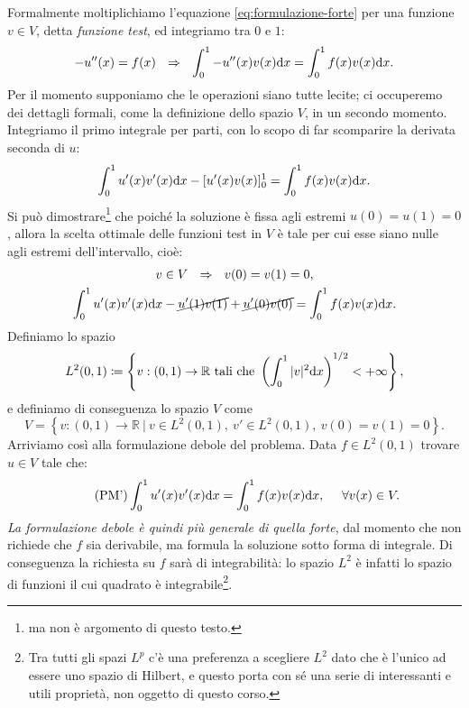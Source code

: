 Formalmente moltiplichiamo l'equazione \eqref{eq:formulazione-forte} per una funzione $v\in V$, detta \textit{funzione test}, ed integriamo tra $0$ e $1$:
\begin{equation*}
	-u''(x) =f(x)\ \ \Rightarrow\ \ \int\nolimits ^{1}_{0} -u''(x) v(x) \dx=\int\nolimits ^{1}_{0} f(x) v(x) \dx.
\end{equation*}
Per il momento supponiamo che le operazioni siano tutte lecite; ci occuperemo dei dettagli formali, come la definizione dello spazio $V$, in un secondo momento.
Integriamo il primo integrale per parti, con lo scopo di far scomparire la derivata seconda di $u$:
\begin{equation*}
	\int\nolimits ^{1}_{0} u'(x) v'(x) \mathrm d x-[ u'(x) v(x)]^{1}_{0} =\int\nolimits ^{1}_{0} f(x) v(x) \mathrm d x.
\end{equation*}
Si può dimostrare\footnote{ma non è argomento di questo testo.} che poiché la soluzione è fissa agli estremi $u(0) =u(1) =0$, allora la scelta ottimale delle funzioni test in $V$ è tale per cui esse siano nulle agli estremi dell'intervallo, cioè:
\begin{gather*}
	v\in V\ \ \Rightarrow \ \ v(0) =v(1) =0,\\
	\int\nolimits ^{1}_{0} u'(x) v'(x) \mathrm d x-\cancel{u'(1) v(1)} +\cancel{u'(0) v(0)} =\int\nolimits ^{1}_{0} f(x) v(x) \mathrm d x.
\end{gather*}
Definiamo lo spazio
\begin{equation*}
	L^{2}( 0,1) \coloneqq \left\{v:( 0,1)\rightarrow \mathbb{R} \ \text{tali che} \ \left(\int ^{1}_{0}| v| ^{2} \mathrm d x\right)^{1/2} < +\infty \right\} ,
\end{equation*}
e definiamo di conseguenza lo spazio $V$ come
\begin{equation*}
	V=\left\{v:( 0,1)\rightarrow \mathbb{R} \ |\ v\in L^{2}( 0,1) ,\ v'\in L^{2}( 0,1) ,\ v(0) =v(1) =0\right\} .
\end{equation*}
Arriviamo così alla formulazione debole del problema. Data $f \in L^{2}(0,1)$ trovare $u \in V$ tale che:
\begin{equation}\tag{PM'}
	\displaystyle\int\nolimits ^{1}_{0} u'(x) v'(x) \mathrm d x=\int\nolimits ^{1}_{0} f(x) v(x) \mathrm d x,\ \ \ \ \forall v(x) \in V.
	\label{eq:formulazione-debole}
\end{equation}
\textit{La formulazione debole è quindi più generale di quella forte}, dal momento che non richiede che $f$ sia derivabile, ma formula la soluzione sotto forma di integrale. Di conseguenza la richiesta su $f$ sarà di integrabilità: lo spazio $L^{2} $ è infatti lo spazio di funzioni il cui quadrato è integrabile\footnote{Tra tutti gli spazi $L^{p} $ c'è una preferenza a scegliere $L^2$ dato che è l'unico ad essere uno spazio di Hilbert, e questo porta con sé una serie di interessanti e utili proprietà, non oggetto di questo corso.}.

